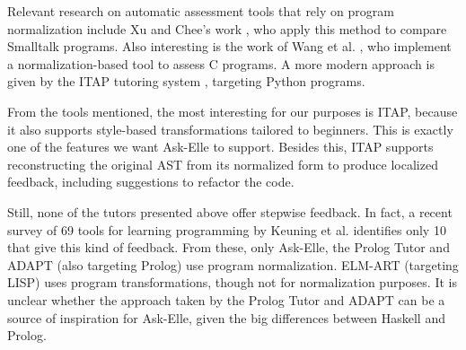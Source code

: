 Relevant research on automatic assessment tools that rely on program normalization include Xu and Chee's work \cite{2003transformation}, who apply this method to compare Smalltalk programs. Also interesting is the work of Wang et al. \cite{2007wang}, who implement a normalization-based tool to assess C programs. A more modern approach is given by the ITAP tutoring system \cite{2017ITAP}, targeting Python programs.

From the tools mentioned, the most interesting for our purposes is ITAP, because it also supports style-based transformations tailored to beginners. This is exactly one of the features we want Ask-Elle to support. Besides this, ITAP supports reconstructing the original AST from its normalized form to produce localized feedback, including suggestions to refactor the code.

Still, none of the tutors presented above offer stepwise feedback. In fact, a recent survey of 69 tools for learning programming by Keuning et al. \cite{2016feedbackreview} identifies only 10 that give this kind of feedback. From these, only Ask-Elle, the Prolog Tutor \cite{2004hong} and ADAPT \cite{1992adapt} (also targeting Prolog) use program normalization. ELM-ART \cite{2001elmart} (targeting LISP) uses program transformations, though not for normalization purposes. It is unclear whether the approach taken by the Prolog Tutor and ADAPT can be a source of inspiration for Ask-Elle, given the big differences between Haskell and Prolog.






